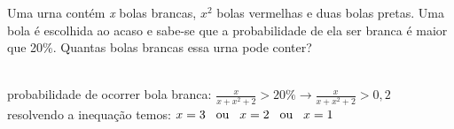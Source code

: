 \begin{ex}
Uma urna contém \textit{x} bolas brancas, $\textit{x}^2$ bolas vermelhas e duas bolas pretas. Uma bola é escolhida ao acaso e sabe-se que a probabilidade de ela ser branca é maior que 20\%. Quantas bolas brancas essa urna pode conter?
  \begin{sol}
    \phantom{A}\\
    probabilidade de ocorrer bola branca: $\frac{x}{x+x^2+2} > 20\% \rightarrow \frac{x}{x+x^2+2} > 0,2$ \\
    resolvendo a inequação temos: $ x=3\hspace{0,3cm} \text{ou}\hspace{0,3cm} x=2\hspace{0,3cm} \text{ou}\hspace{0,3cm} x=1$
  \end{sol}
\end{ex}